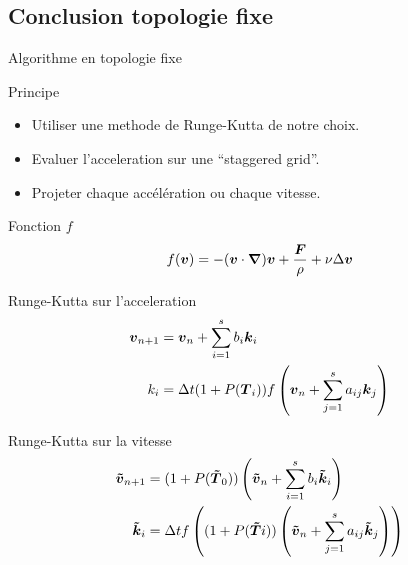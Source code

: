 \subsection{Conclusion topologie fixe}
\begin{frame}[<+->][shrink]{Algorithme en topologie fixe}
 \begin{block}{Principe}
  \begin{itemize}
   \item<1-> Utiliser une methode de Runge-Kutta de notre choix.
   \item Evaluer l'acceleration sur une ``staggered grid''.
   \item Projeter chaque accélération ou chaque vitesse.
  \end{itemize}
 \end{block}
 \begin{block}{Fonction $f$}
 \vspace{-0.5cm}
 \begin{equation*}
  f({\boldsymbol {v}})=-({\boldsymbol {v}}\cdot{\boldsymbol {\nabla}} ) {\boldsymbol {v}}+\frac{{\boldsymbol {F}}}{\rho}+\nu \Delta {\boldsymbol {v}}
  \end{equation*}
 \end{block}

\begin{block}{Runge-Kutta sur l'acceleration}
 \vspace{-0.7cm}
	\begin{align*}
	{\boldsymbol {v}}_{n+1}&={\boldsymbol {v}}_{n}+\sum_{i=1}^{s}b_{i}{\boldsymbol {k}}_{i}\\
	k_{i}&=\Delta t (1+P({\boldsymbol {T}}_{i}))f\left({\boldsymbol {v}}_{n}+\sum_{j=1}^{s}a_{ij}{\boldsymbol {k}}_{j}\right)
	\end{align*}
\end{block}
 
\begin{block}{Runge-Kutta sur la vitesse}
 \vspace{-0.5cm}
	\begin{align*}
	{\boldsymbol {\tilde{v}}}_{n+1}&=(1+P({\boldsymbol {\tilde{T}}}_0))\left({\boldsymbol {\tilde{v}}}_{n}+\sum_{i=1}^{s}b_{i}{\boldsymbol {\tilde{k}}}_{i}\right)\\
	{\boldsymbol {\tilde{k}}}_{i}&=\Delta t f\left((1+P({\boldsymbol {\tilde{T}}}{i}))\left({\boldsymbol {\tilde{v}}}_{n}+\sum_{j=1}^{s}a_{ij}{\boldsymbol {\tilde{k}}}_{j}\right)\right)
	\end{align*}
\end{block}
\end{frame}

